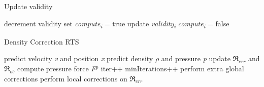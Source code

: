 \documentclass[../../main.tex]{subfiles}
\begin{document}
 
\begin{algorithm}[h]
    \caption{Update validity}
    \label{alg:validity}
    \begin{algorithmic}[1]
            \State decrement validity
                \State set \textit{{\texorpdfstring{compute\textsubscript{i}}{compute i}}} = true
                \State update \textit{{\texorpdfstring{validity\textsubscript{i}}{validity i}}}
            \Else
                \State \textit{{\texorpdfstring{compute\textsubscript{i}}{compute i}}} = false
            \EndIf
        \EndFor
   \end{algorithmic}
\end{algorithm}


\begin{algorithm}[h]
    \caption{Density Correction RTS}
    \label{alg:rts:correction}
    \begin{algorithmic}[1]
            \State predict velocity \textit{v} and position \textit{x}
            \State predict density $\rho$ and pressure \textit{p}
                \State update $\Re_{err}$ and $\Re_{ob}$
            \EndIf
                \State compute pressure force \textit{F}$^p$
            \EndIf
            \State iter++
                \State minIterations++
                    \State perform extra global corrections
                \Else
                    \State perform local corrections on $\Re_{err}$
                \EndIf
            \EndIf
        \EndWhile
   \end{algorithmic}
\end{algorithm}
\end{document}
